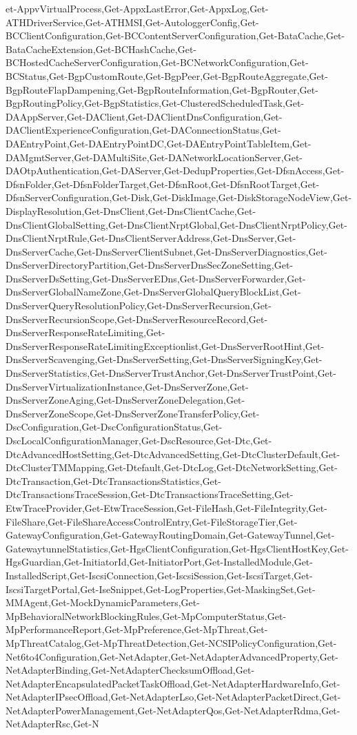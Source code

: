 {{et-AppvVirtualProcess,Get-AppxLastError,Get-AppxLog,Get-ATHDriverService,Get-ATHMSI,Get-AutologgerConfig,Get-BCClientConfiguration,Get-BCContentServerConfiguration,Get-BataCache,Get-BataCacheExtension,Get-BCHashCache,Get-BCHostedCacheServerConfiguration,Get-BCNetworkConfiguration,Get-BCStatus,Get-BgpCustomRoute,Get-BgpPeer,Get-BgpRouteAggregate,Get-BgpRouteFlapDampening,Get-BgpRouteInformation,Get-BgpRouter,Get-BgpRoutingPolicy,Get-BgpStatistics,Get-ClusteredScheduledTask,Get-DAAppServer,Get-DAClient,Get-DAClientDnsConfiguration,Get-DAClientExperienceConfiguration,Get-DAConnectionStatus,Get-DAEntryPoint,Get-DAEntryPointDC,Get-DAEntryPointTableItem,Get-DAMgmtServer,Get-DAMultiSite,Get-DANetworkLocationServer,Get-DAOtpAuthentication,Get-DAServer,Get-DedupProperties,Get-DfsnAccess,Get-DfsnFolder,Get-DfsnFolderTarget,Get-DfsnRoot,Get-DfsnRootTarget,Get-DfsnServerConfiguration,Get-Disk,Get-DiskImage,Get-DiskStorageNodeView,Get-DisplayResolution,Get-DnsClient,Get-DnsClientCache,Get-DnsClientGlobalSetting,Get-DnsClientNrptGlobal,Get-DnsClientNrptPolicy,Get-DnsClientNrptRule,Get-DnsClientServerAddress,Get-DnsServer,Get-DnsServerCache,Get-DnsServerClientSubnet,Get-DnsServerDiagnostics,Get-DnsServerDirectoryPartition,Get-DnsServerDnsSecZoneSetting,Get-DnsServerDsSetting,Get-DnsServerEDns,Get-DnsServerForwarder,Get-DnsServerGlobalNameZone,Get-DnsServerGlobalQueryBlockList,Get-DnsServerQueryResolutionPolicy,Get-DnsServerRecursion,Get-DnsServerRecursionScope,Get-DnsServerResourceRecord,Get-DnsServerResponseRateLimiting,Get-DnsServerResponseRateLimitingExceptionlist,Get-DnsServerRootHint,Get-DnsServerScavenging,Get-DnsServerSetting,Get-DnsServerSigningKey,Get-DnsServerStatistics,Get-DnsServerTrustAnchor,Get-DnsServerTrustPoint,Get-DnsServerVirtualizationInstance,Get-DnsServerZone,Get-DnsServerZoneAging,Get-DnsServerZoneDelegation,Get-DnsServerZoneScope,Get-DnsServerZoneTransferPolicy,Get-DscConfiguration,Get-DscConfigurationStatus,Get-DscLocalConfigurationManager,Get-DscResource,Get-Dtc,Get-DtcAdvancedHostSetting,Get-DtcAdvancedSetting,Get-DtcClusterDefault,Get-DtcClusterTMMapping,Get-Dtefault,Get-DtcLog,Get-DtcNetworkSetting,Get-DtcTransaction,Get-DtcTransactionsStatistics,Get-DtcTransactionsTraceSession,Get-DtcTransactionsTraceSetting,Get-EtwTraceProvider,Get-EtwTraceSession,Get-FileHash,Get-FileIntegrity,Get-FileShare,Get-FileShareAccessControlEntry,Get-FileStorageTier,Get-GatewayConfiguration,Get-GatewayRoutingDomain,Get-GatewayTunnel,Get-GatewaytunnelStatistics,Get-HgsClientConfiguration,Get-HgsClientHostKey,Get-HgsGuardian,Get-InitiatorId,Get-InitiatorPort,Get-InstalledModule,Get-InstalledScript,Get-IscsiConnection,Get-IscsiSession,Get-IscsiTarget,Get-IscsiTargetPortal,Get-IseSnippet,Get-LogProperties,Get-MaskingSet,Get-MMAgent,Get-MockDynamicParameters,Get-MpBehavioralNetworkBlockingRules,Get-MpComputerStatus,Get-MpPerformanceReport,Get-MpPreference,Get-MpThreat,Get-MpThreatCatalog,Get-MpThreatDetection,Get-NCSIPolicyConfiguration,Get-Net6to4Configuration,Get-NetAdapter,Get-NetAdapterAdvancedProperty,Get-NetAdapterBinding,Get-NetAdapterChecksumOffload,Get-NetAdapterEncapsulatedPacketTaskOffload,Get-NetAdapterHardwareInfo,Get-NetAdapterIPsecOffload,Get-NetAdapterLso,Get-NetAdapterPacketDirect,Get-NetAdapterPowerManagement,Get-NetAdapterQos,Get-NetAdapterRdma,Get-NetAdapterRsc,Get-N}}
